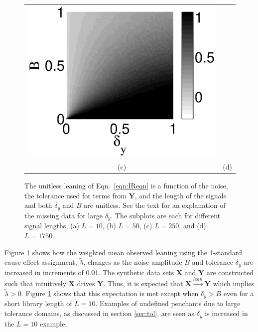 \documentclass[twocolumn,aps,pre,groupedaddress]{revtex4-1}
\begin{document}
\begin{figure}[ht]
\begin{tabular}{cc}
\includegraphics[scale=0.38]{SimpleIRexample_diffLpart4.eps} \\
(c) & (d) \\
\end{tabular}
\caption{The unitless leaning of Eqn.\ \ref{eqn:IReqn} is a function of the noise, the tolerance used for terms from $\mathbf{Y}$, and the length of the signals and both $\delta_y$ and $B$ are unitless.  See the text for an explanation of the missing data for large $\delta_y$.  The subplots are each for different signal lengths, (a) $L=10$, (b) $L=50$, (c) $L=250$, and (d) $L=1750$.}
\label{fig:IRexChangeL}
\end{figure}

Figure \ref{fig:IRexChangeL} shows how the weighted mean observed leaning using the 1-standard cause-effect assignment, $\tilde{\lambda}$, changes as the noise amplitude $B$ and tolerance $\delta_y$ are increased in increments of 0.01.  The synthetic data sets $\mathbf{X}$ and $\mathbf{Y}$ are constructed such that intuitively $\mathbf{X}$ drives $\mathbf{Y}$.  Thus, it is expected that $\mathbf{X}\xrightarrow{lean}\mathbf{Y}$ which implies $\tilde{\lambda} > 0$.  Figure \ref{fig:IRexChangeL} shows that this expectation is met except when $\delta_y > B$ even for a short library length of $L=10$.  Examples of undefined penchants due to large tolerance domains, as discussed in section \ref{sec:tol}, are seen as $\delta_y$ is increased in the $L=10$ example.
\end{document}
